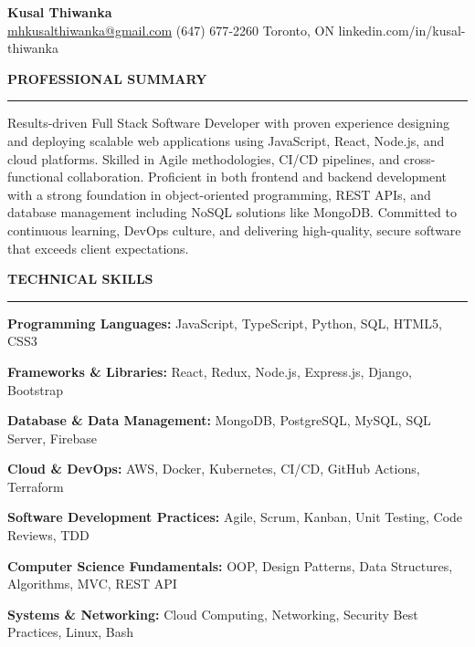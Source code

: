 \documentclass[10pt,letterpaper]{article}
\begin{document}
\begin{center}
{\LARGE\textbf{Kusal Thiwanka}}\\[3pt]
\href{mailto:mhkusalthiwanka@gmail.com}{mhkusalthiwanka@gmail.com}\hspace{2em}%
(647) 677{-}2260\hspace{2em}%
Toronto, ON\hspace{2em}
linkedin.com/in/kusal-thiwanka
\end{center}

\vspace{6pt}

\textbf{PROFESSIONAL SUMMARY}\\[-8pt]
\noindent\rule{\textwidth}{1pt}

\vspace{-2pt}

Results-driven Full Stack Software Developer with proven experience designing and deploying scalable web applications using JavaScript, React, Node.js, and cloud platforms. Skilled in Agile methodologies, CI/CD pipelines, and cross-functional collaboration. Proficient in both frontend and backend development with a strong foundation in object-oriented programming, REST APIs, and database management including NoSQL solutions like MongoDB. Committed to continuous learning, DevOps culture, and delivering high-quality, secure software that exceeds client expectations.

\vspace{8pt}

\textbf{TECHNICAL SKILLS}\\[-8pt]
\noindent\rule{\textwidth}{1pt}

\vspace{-2pt}

\textbf{Programming Languages:} JavaScript, TypeScript, Python, SQL, HTML5, CSS3

\textbf{Frameworks \& Libraries:} React, Redux, Node.js, Express.js, Django, Bootstrap

\textbf{Database \& Data Management:} MongoDB, PostgreSQL, MySQL, SQL Server, Firebase

\textbf{Cloud \& DevOps:} AWS, Docker, Kubernetes, CI/CD, GitHub Actions, Terraform

\textbf{Software Development Practices:} Agile, Scrum, Kanban, Unit Testing, Code Reviews, TDD

\textbf{Computer Science Fundamentals:} OOP, Design Patterns, Data Structures, Algorithms, MVC, REST API

\textbf{Systems \& Networking:} Cloud Computing, Networking, Security Best Practices, Linux, Bash
\end{document}
